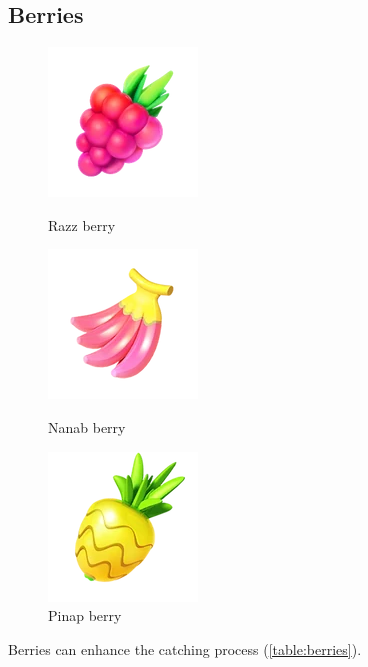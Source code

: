 \subsection{Berries}
\begin{figure}[h!]
  \begin{minipage}[t]{0.3\textwidth}
    \begin{center}
    \includegraphics[scale=.4]{images/razz.png}
    \end{center}
    \caption*{Razz berry}
    \label{fig:razz}
  \end{minipage}
  \begin{minipage}[t]{0.3\textwidth}
    \begin{center}
    \includegraphics[scale=.4]{images/nanab.png}
    \end{center}
    \caption*{Nanab berry}
    \label{fig:nanab}
  \end{minipage}
  \begin{minipage}[t]{0.3\textwidth}
    \begin{center}
    \includegraphics[scale=.4]{images/pinap.png}
    \end{center}
    \caption*{Pinap berry}
    \label{fig:pinap}
  \end{minipage}
\end{figure}
Berries can enhance the catching process (\autoref{table:berries}).
